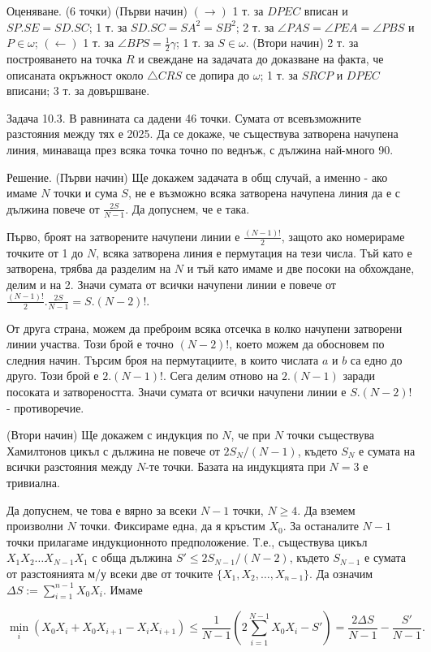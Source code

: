 Оценяване. (6 точки) (Първи начин) $(\rightarrow)$ 1 т. за $DPEC$ вписан и $SP.SE=SD.SC$; 1 т. за $SD.SC=SA^2=SB^2$; 2 т. за $\angle PAS=\angle PEA=\angle PBS$ и $P\in\omega$; $(\leftarrow)$ 1 т. за $\angle BPS=\frac12\gamma$; 1 т. за $S\in\omega$. (Втори начин) 2 т. за построяването на точка $R$ и свеждане на задачата до доказване на факта, че описаната окръжност около $\triangle CRS$ се допира до $\omega$; 1 т. за $SRCP$ и $DPEC$ вписани; 3 т. за довършване.

Задача 10.3. В равнината са дадени 46 точки. Сумата от всевъзможните разстояния между тях е 2025. Да се докаже, че съществува затворена начупена линия, минаваща през всяка точка точно по веднъж, с дължина най-много 90.

Решение. (Първи начин) Ще докажем задачата в общ случай, а именно - ако имаме $N$ точки и сума $S$, не е възможно всяка затворена начупена линия да е с дължина повече от $\frac{2S}{N-1}$. Да допуснем, че е така.

Първо, броят на затворените начупени линии е $\frac{(N-1)!}{2}$, защото ако номерираме точките от 1 до $N$, всяка затворена линия е пермутация на тези числа. Тъй като е затворена, трябва да разделим на $N$ и тъй като имаме и две посоки на обхождане, делим и на 2. Значи сумата от всички начупени линии е повече от $\frac{(N-1)!}{2}.\frac{2S}{N-1}=S.(N-2)!$.

От друга страна, можем да преброим всяка отсечка в колко начупени затворени линии участва. Този брой е точно $(N-2)!$, което можем да обосновем по следния начин. Търсим броя на пермутациите, в които числата $a$ и $b$ са едно до друго. Този брой е $2.(N-1)!$. Сега делим отново на $2.(N-1)$ заради посоката и затвореността. Значи сумата от всички начупени линии е $S.(N-2)!$ - противоречие.

(Втори начин) Ще докажем с индукция по $N$, че при $N$ точки съществува Хамилтонов цикъл с дължина не повече от $2S_N/(N-1)$, където $S_N$ е сумата на всички разстояния между $N$-те точки. Базата на индукцията при $N=3$ е тривиална.

Да допуснем, че това е вярно за всеки $N-1$ точки, $N\ge4$. Да вземем произволни $N$ точки. Фиксираме една, да я кръстим $X_0$. За останалите $N-1$ точки прилагаме индукционното предположение. Т.е., съществува цикъл $X_1X_2\ldots X_{N-1}X_1$ с обща дължина $S'\le2S_{N-1}/(N-2)$, където $S_{N-1}$ е сумата от разстоянията м/у всеки две от точките $\{X_1,X_2,\ldots,X_{n-1}\}$. Да означим $\Delta S:=\sum_{i=1}^{n-1}X_0X_i$. Имаме

$$\min_i(X_0X_i+X_0X_{i+1}-X_iX_{i+1})\le\frac{1}{N-1}\left(2\sum_{i=1}^{N-1}X_0X_i-S'\right)=\frac{2\Delta S}{N-1}-\frac{S'}{N-1}.$$


